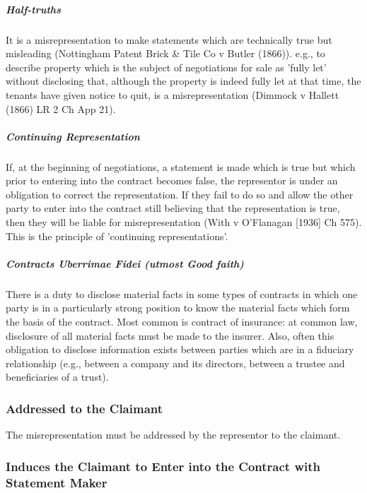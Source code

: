 \documentclass[
]{article}
\begin{document}
\hypertarget{half-truths}{%
\subparagraph{Half-truths}\label{half-truths}}

It is a misrepresentation to make statements which are technically true
but misleading (Nottingham Patent Brick \& Tile Co v Butler (1866)).
e.g., to describe property which is the subject of negotiations for sale
as 'fully let' without disclosing that, although the property is indeed
fully let at that time, the tenants have given notice to quit, is a
misrepresentation (Dimmock v Hallett (1866) LR 2 Ch App 21).

\hypertarget{continuing-representation}{%
\subparagraph{Continuing
Representation}\label{continuing-representation}}

If, at the beginning of negotiations, a statement is made which is true
but which prior to entering into the contract becomes false, the
representor is under an obligation to correct the representation. If
they fail to do so and allow the other party to enter into the contract
still believing that the representation is true, then they will be
liable for misrepresentation (With v O'Flanagan {[}1936{]} Ch 575). This
is the principle of 'continuing representations'.

\hypertarget{contracts-uberrimae-fidei-utmost-good-faith}{%
\subparagraph{Contracts Uberrimae Fidei (utmost Good
faith)}\label{contracts-uberrimae-fidei-utmost-good-faith}}

There is a duty to disclose material facts in some types of contracts in
which one party is in a particularly strong position to know the
material facts which form the basis of the contract. Most common is
contract of insurance: at common law, disclosure of all material facts
must be made to the insurer. Also, often this obligation to disclose
information exists between parties which are in a fiduciary relationship
(e.g., between a company and its directors, between a trustee and
beneficiaries of a trust).

\hypertarget{addressed-to-the-claimant}{%
\subsubsection{Addressed to the
Claimant}\label{addressed-to-the-claimant}}

The misrepresentation must be addressed by the representor to the
claimant.

\hypertarget{induces-the-claimant-to-enter-into-the-contract-with-statement-maker}{%
\subsubsection{Induces the Claimant to Enter into the Contract with
Statement
Maker}\label{induces-the-claimant-to-enter-into-the-contract-with-statement-maker}}
\end{document}

